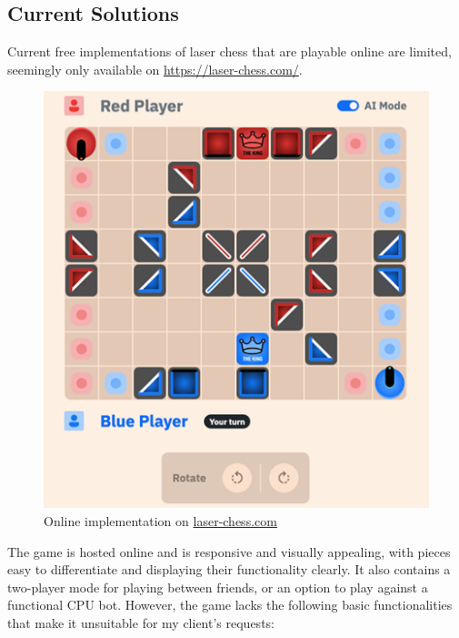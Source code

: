 \documentclass[../main/main.tex]{subfiles}
\begin{document}
\subsection{Current Solutions}
Current free implementations of laser chess that are playable online are limited, seemingly only available on \url{https://laser-chess.com/}.

\begin{figure}[H]
    \centering
    \includegraphics[width=0.6\columnwidth]{../analysis/assets/laser_chess_com.png}
    \caption{Online implementation on \href{https://laser-chess.com/}{laser-chess.com}}
    \label{fig:laser-chess-com}
\end{figure}

The game is hosted online and is responsive and visually appealing, with pieces easy to differentiate and displaying their functionality clearly. It also contains a two-player mode for playing between friends, or an option to play against a functional CPU bot. However, the game lacks the following basic functionalities that make it unsuitable for my client’s requests:
\end{document}
